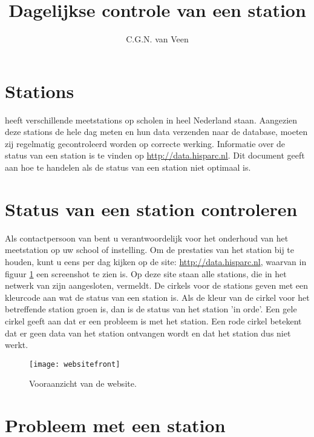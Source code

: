 



\title{Dagelijkse controle van een station}
\author{C.G.N. van Veen} 
\date{}

\maketitle

\section{Stations}

\hisparc heeft verschillende meetstations op scholen in heel Nederland staan. 
Aangezien deze stations de hele dag meten en hun data verzenden naar de \hisparc database, moeten zij regelmatig gecontroleerd worden op correcte werking.
Informatie over de status van een station is te vinden op \url {http://data.hisparc.nl}.
Dit document geeft aan hoe te handelen als de status van een station niet optimaal is.

\section{Status van een station controleren}

Als contactpersoon van \hisparc bent u verantwoordelijk voor het onderhoud van het meetstation op uw school of instelling.
Om de prestaties van het station bij te houden, kunt u eens per dag kijken op de site: \url  {http://data.hisparc.nl}, waarvan in figuur \ref{fig:frontweb} een screenshot te zien is.
Op deze site staan alle stations, die in het netwerk van \hisparc zijn aangesloten, vermeldt. 
De cirkels voor de stations geven met een kleurcode aan wat de status van een station is. Als de kleur van de cirkel voor het betreffende station groen is, dan is de status van het station 'in orde'. 
Een gele cirkel geeft aan dat er een probleem is met het station. Een rode cirkel betekent dat er geen data van het station ontvangen wordt en dat het station dus niet werkt.

\begin{figure}
    \centering
    \texttt{[image: websitefront]}
    \caption{Vooraanzicht van de \hisparc website.}
   \label{fig:frontweb}
\end{figure}

\section{Probleem met een station}

